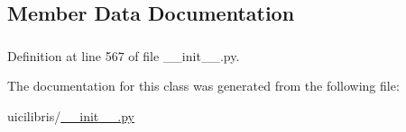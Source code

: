 \subsection{\-Member \-Data \-Documentation}
\hypertarget{classuicilibris_1_1latexViewThread_a2280202512f395afb09e42f820d27fad}{
\subsubsection[{pdf\-File\-Name}]{}}\label{classuicilibris_1_1latexViewThread_a2280202512f395afb09e42f820d27fad}


\-Definition at line 567 of file \-\_\-\-\_\-init\-\_\-\-\_\-.\-py.



\-The documentation for this class was generated from the following file\-:\begin{DoxyCompactItemize}
\item 
uicilibris/\hyperlink{____init_____8py}{\-\_\-\-\_\-init\-\_\-\-\_\-.\-py}\end{DoxyCompactItemize}
